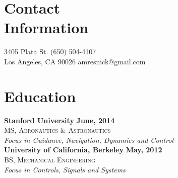 \documentclass[margin,line]{resume}
\begin{document}
\begin{resume}

    \section{\mysidestyle Contact\\Information}

    3405 Plata St.						                       \hfill (650) 504-4107\\
    Los Angeles, CA 90026								\hfill amresnick@gmail.com

    \section{\mysidestyle Education}

    \textbf{Stanford University} \hfill \textbf{June, 2014} \\%
    \textsc{MS, Aeronautics \& Astronautics}\\
    \textit{Focus in Guidance, Navigation, Dynamics and Control} \vspace{3mm}\\
    \textbf{University of California, Berkeley} \hfill \textbf{May, 2012}\\%
    \textsc{BS, Mechanical Engineering} \\ 
    \textit{Focus in Controls, Signals and Systems}\\\vspace{-5mm}


\end{resume}
\end{document}
